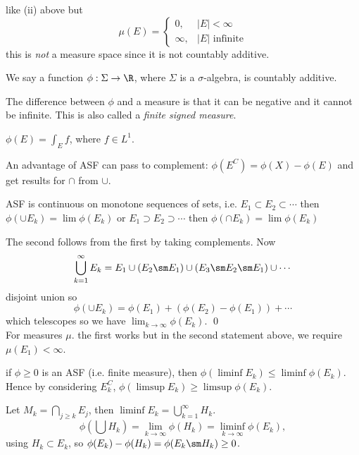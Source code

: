 \begin{nex}
like (ii) above but
	\[
	\mu(E)=
	\begin{cases}
	0, & |E|<\infty \\
	\infty, & |E| \text{ infinite}
	\end{cases}
	\]
this is \emph{not} a measure space since it is not countably additive. 
\end{nex}


\begin{dfn}
We say a function $\phi: \Sigma \to \R$, where $\Sigma$ is a $\sigma$-algebra, is countably additive. 
\end{dfn}


The difference between $\phi$ and a measure is that it can be negative and it cannot be infinite. This is also called a \emph{finite signed measure}. 


\begin{ex}
$\phi(E)= \int_E f$, where $f \in L^1$. 
\end{ex}

An advantage of ASF can pass to complement: $\phi(E^C)= \phi(X) - \phi(E)$ and get results for $\cap$ from $\cup$.


\begin{thm}
ASF is continuous on monotone sequences of sets, i.e. $E_1 \subset E_2 \subset \cdots$ then $\phi(\cup E_k)= \lim \phi(E_k)$ or $E_1 \supset E_2 \supset \cdots$ then $\phi(\cap E_k)= \lim \phi(E_k)$
\end{thm}

\pf The second follows from the first by taking complements. Now
	\[
	\bigcup_{k=1}^\infty E_k= E_1 \cup (E_2 \sm E_1) \cup (E_3 \sm E_2 \sm E_1) \cup \cdots
	\]
disjoint union so
	\[
	\phi(\cup E_k) = \phi(E_1) + (\phi(E_2) - \phi(E_1)) + \cdots
	\]
which telescopes so we have $\lim_{k \to \infty} \phi(E_k)$. \qed \\


For measures $\mu$. the first works but in the second statement above, we require $\mu(E_1)< \infty$.


\begin{thm}
if $\phi \geq 0$ is an ASF (i.e. finite measure), then $\phi(\liminf E_k) \leq \liminf \phi(E_k)$. Hence by considering $E^C_k$, $\phi(\limsup E_k) \geq \limsup \phi(E_k)$. 
\end{thm}

\pf Let $M_k= \bigcap_{j \geq k} E_j$, then $\liminf E_k= \bigcup_{k=1}^\infty H_k$.
	\[
	\phi \left( \bigcup H_k \right) = \lim_{k \to \infty} \phi(H_k)= \liminf_{k \to \infty} \phi(E_k),
	\]
using $H_k \subset E_k$, so $\phi(E_k) - \phi(H_k)= \phi(E_k \sm H_k) \geq 0$. 




